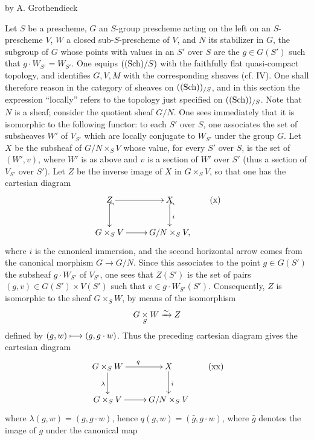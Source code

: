 \label{XIII}
\begin{center}by A. Grothendieck\end{center}
{\renewcommand{\thefootnote}{0}}
\setcounter{footnote}{0}

Let $S$ be a prescheme, $G$ an $S$-group prescheme acting on the left on an
$S$-prescheme $V$, $W$ a closed sub-$S$-prescheme of $V$, and $N$ its stabilizer
in $G$, the subgroup of $G$ whose points with values in an $S'$ over $S$ are the
$g\in G(S')$ such that $g\cdot W_{S'}=W_{S'}$. One equips $(\textup{(Sch)}/S)$ with the
faithfully flat quasi-compact topology, and identifies $G,V,M$ with the
corresponding sheaves (cf. IV).
One shall therefore reason in the category of sheaves on $(\textup{(Sch)})_{/S}$, and in
this section the expression ``locally'' refers to the topology just specified on
$(\textup{(Sch)})_{/S}$. Note that $N$ is a sheaf; consider the quotient sheaf $G/N$.
One sees immediately that it is isomorphic to the following functor: to each
$S'$ over $S$, one associates the set of subsheaves $W'$ of $V_{S'}$ which are
locally conjugate to $W_{S'}$ under the group $G$. Let $X$ be the subsheaf of
$G/N\times_S V$ whose value, for every $S'$ over $S$, is the set of $(W',v)$,
where $W'$ is as above and $v$ is a section of $W'$ over $S'$ (thus a section of
$V_{S'}$ over $S'$). Let $Z$ be the inverse image of $X$ in $G\times_S V$, so
that one has the cartesian diagram
\[
\xymatrix{
 Z\ar[r]\ar@{^{(}->}[d]&X\ar@{^{(}->}[d]^i\\
 G\times_S V\ar[r]&G/N\times_S V,
}\tag{x}
\]
where $i$ is the canonical immersion, and the second horizontal arrow comes
from the canonical morphism $G\to G/N$. Since this associates to the point
$g\in G(S')$ the subsheaf $g\cdot W_{S'}$ of $V_{S'}$, one sees that $Z(S')$ is
the set of pairs $(g,v)\in G(S')\times V(S')$ such that
$v\in g\cdot W_{S'}(S')$. Consequently, $Z$ is isomorphic to the sheaf
$G\times_S W$, by means of the isomorphism
\[
 G\underset{S}{\times}W\xrightarrow{\sim} Z
\]
defined by $(g,w)\longmapsto(g,g\cdot w)$. Thus the preceding cartesian diagram gives
the cartesian diagram
\[
\xymatrix{
 G\times_S W\ar[r]^q\ar[d]_\lambda&X\ar[d]^i\\
 G\times_S V\ar[r]&G/N\times_S V
}\tag{xx}
\]
where $\lambda(g,w)=(g,g\cdot w)$, hence $q(g,w)=(\bar g,g\cdot w)$, where
$\bar g$ denotes the image of $g$ under the canonical map
